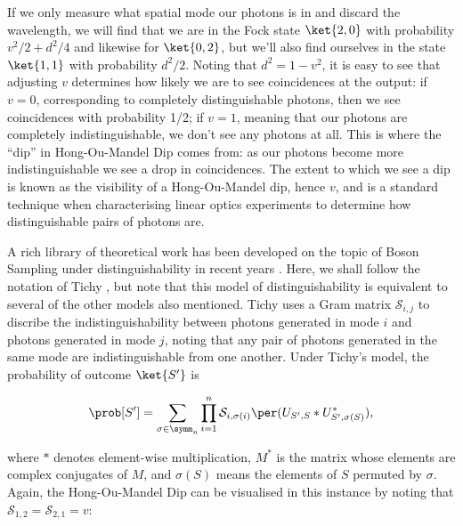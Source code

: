 If we only measure what spatial mode our photons is in and discard the wavelength, we will find that we are in the Fock state $\ket{2,0}$ with probability $v^2/2 + d^2/4$ and likewise for $\ket{0,2}$, but we'll also find ourselves in the state $\ket{1,1}$ with probability $d^2/2$. Noting that $d^2 = 1-v^2$, it is easy to see that adjusting $v$ determines how likely we are to see coincidences at the output: if $v=0$, corresponding to completely distinguishable photons, then we see coincidences with probability 1/2; if $v=1$, meaning that our photons are completely indistinguishable, we don't see any photons at all. This is where the ``dip'' in Hong-Ou-Mandel Dip comes from: as our photons become more indistinguishable we see a drop in coincidences. The extent to which we see a dip is known as the visibility of a Hong-Ou-Mandel dip, hence $v$, and is a standard technique when characterising linear optics experiments to determine how distinguishable pairs of photons are.

A rich library of theoretical work has been developed on the topic of Boson Sampling under distinguishability in recent years \cite{rohde2015, shchesnovich2015, tichy2015, tamma2016nonidentical, menssen2017}. Here, we shall follow the notation of Tichy \cite{tichy2015}, but note that this model of distinguishability is equivalent to several of the other models also mentioned. Tichy uses a Gram matrix $\mathcal{S}_{i,j}$ to discribe the indistinguishability between photons generated in mode $i$ and photons generated in mode $j$, noting that any pair of photons generated in the same mode are indistinguishable from one another. Under Tichy's model, the probability of outcome $\ket{S'}$ is

\begin{equation}
\prob[S'] = \sum_{\sigma\in\symm_n}\prod_{i=1}^n\mathcal{S}_{i,\sigma(i)}\per(U_{S',S}*U_{S',\sigma(S)}^*),
\label{eqn:tichy-perm}
\end{equation}

\noindent where $*$ denotes element-wise multiplication, $M^*$ is the matrix whose elements are complex conjugates of $M$, and $\sigma(S)$ means the elements of $S$ permuted by $\sigma$. Again, the Hong-Ou-Mandel Dip can be visualised in this instance by noting that $\mathcal{S}_{1,2} = \mathcal{S}_{2,1} = v$:

